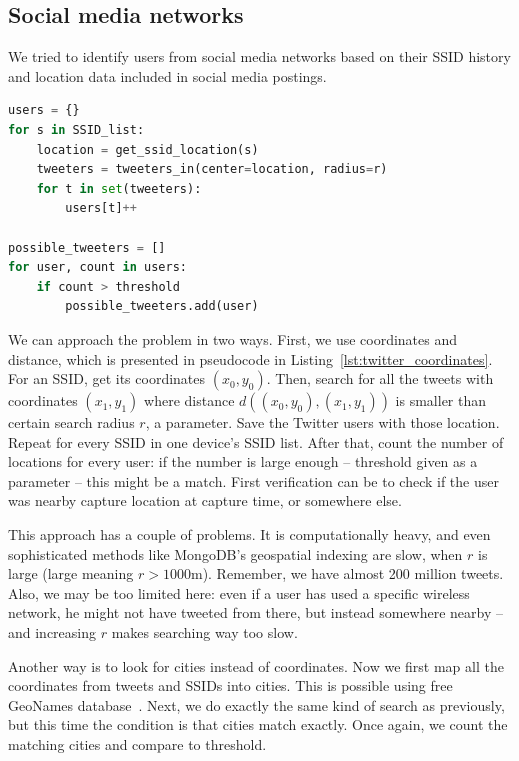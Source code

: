 \documentclass[12pt,a4paper,oneside,pdftex]{report}
\begin{document}
\subsection{Social media networks}
\label{sec:practical_social}

We tried to identify users from social media networks based on their SSID history and location data included in social media postings. 

\begin{lstlisting}[language=Python, 
    caption={Pseudocode for finding Twitter users},
    label={lst:twitter_coordinates}
]
users = {}
for s in SSID_list:
    location = get_ssid_location(s)
    tweeters = tweeters_in(center=location, radius=r)
    for t in set(tweeters):
        users[t]++

possible_tweeters = []
for user, count in users:
    if count > threshold
        possible_tweeters.add(user)
\end{lstlisting}

We can approach the problem in two ways. First, we use coordinates and distance, which is presented in pseudocode in Listing~\ref{lst:twitter_coordinates}. For an SSID, get its coordinates $(x_0, y_0)$. Then, search for all the tweets with coordinates $(x_1, y_1)$ where distance 
$d\left( (x_0,y_0), (x_1,y_1) \right)$ 
is smaller than certain search radius $r$, a parameter. Save the Twitter users with those location. Repeat for every SSID in one device's SSID list. After that, count the number of locations for every user: if the number is large enough -- threshold given as a parameter -- this might be a match. First verification can be to check if the user was nearby capture location at capture time, or somewhere else.

This approach has a couple of problems. It is computationally heavy, and even sophisticated methods like MongoDB's geospatial indexing are slow, when $r$ is large (large meaning $r>1000 \text{m}$). Remember, we have almost 200 million tweets. Also, we may be too limited here: even if a user has used a specific wireless network, he might not have tweeted from there, but instead somewhere nearby -- and increasing $r$ makes searching way too slow.

Another way is to look for cities instead of coordinates. Now we first map all the coordinates from tweets and SSIDs into cities. This is possible using free GeoNames database~\cite{geonames}. Next, we do exactly the same kind of search as previously, but this time the condition is that cities match exactly. Once again, we count the matching cities and compare to threshold.
\end{document}
